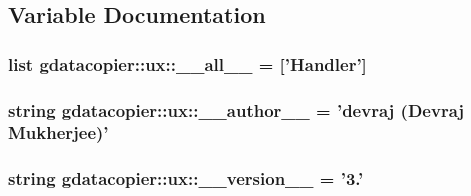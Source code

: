 \subsection{\-Variable \-Documentation}
\hypertarget{namespacegdatacopier_1_1ux_a736d1639256447517e997966acbca29a}{
\subsubsection[{\-\_\-\-\_\-all\-\_\-\-\_\-}]{\setlength{\rightskip}{0pt plus 5cm}list {\bf gdatacopier\-::ux\-::\-\_\-\-\_\-all\-\_\-\-\_\-} = \mbox{[}'{\bf \-Handler}'\mbox{]}}}\label{namespacegdatacopier_1_1ux_a736d1639256447517e997966acbca29a}
\hypertarget{namespacegdatacopier_1_1ux_acbef417238cefac3b7c893c4293e851e}{
\subsubsection[{\-\_\-\-\_\-author\-\_\-\-\_\-}]{\setlength{\rightskip}{0pt plus 5cm}string {\bf gdatacopier\-::ux\-::\-\_\-\-\_\-author\-\_\-\-\_\-} = 'devraj (\-Devraj \-Mukherjee)'}}\label{namespacegdatacopier_1_1ux_acbef417238cefac3b7c893c4293e851e}
\hypertarget{namespacegdatacopier_1_1ux_a077784934fd74abb38c0d6f75e5df532}{
\subsubsection[{\-\_\-\-\_\-version\-\_\-\-\_\-}]{\setlength{\rightskip}{0pt plus 5cm}string {\bf gdatacopier\-::ux\-::\-\_\-\-\_\-version\-\_\-\-\_\-} = '3.'}}\label{namespacegdatacopier_1_1ux_a077784934fd74abb38c0d6f75e5df532}
